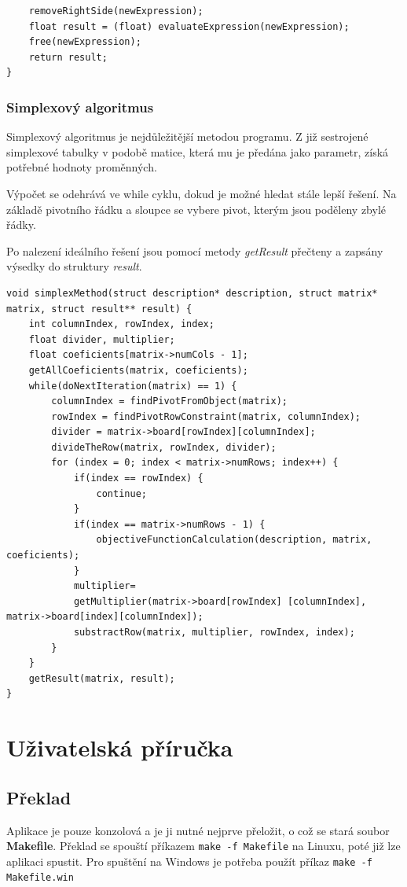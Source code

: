 \documentclass[
12pt,
a4paper,
pdftex,
czech,
titlepage
]{report}
\begin{document}
\begin{itemize}[label={}]
\begin{lstlisting}
    removeRightSide(newExpression);
    float result = (float) evaluateExpression(newExpression);
    free(newExpression);
    return result;
}
\end{lstlisting}

\subsection{Simplexový algoritmus}
Simplexový algoritmus je nejdůležitější metodou programu. Z již sestrojené simplexové tabulky v podobě matice, která mu je předána jako parametr, získá potřebné hodnoty proměnných.

Výpočet se odehrává ve while cyklu, dokud je možné hledat stále lepší řešení. Na základě pivotního řádku a sloupce se vybere pivot, kterým jsou poděleny zbylé řádky.

Po nalezení ideálního řešení jsou pomocí metody \textit{getResult} přečteny a zapsány výsedky do struktury \textit{result}.
\begin{lstlisting}
void simplexMethod(struct description* description, struct matrix* matrix, struct result** result) {
    int columnIndex, rowIndex, index;
    float divider, multiplier;
    float coeficients[matrix->numCols - 1];
    getAllCoeficients(matrix, coeficients);
    while(doNextIteration(matrix) == 1) {
        columnIndex = findPivotFromObject(matrix);
        rowIndex = findPivotRowConstraint(matrix, columnIndex);
        divider = matrix->board[rowIndex][columnIndex];
        divideTheRow(matrix, rowIndex, divider);
        for (index = 0; index < matrix->numRows; index++) {
            if(index == rowIndex) {
                continue;
            }
            if(index == matrix->numRows - 1) {
                objectiveFunctionCalculation(description, matrix, coeficients);
            }
            multiplier=
            getMultiplier(matrix->board[rowIndex] [columnIndex], matrix->board[index][columnIndex]);
            substractRow(matrix, multiplier, rowIndex, index);
        }
    }
    getResult(matrix, result);
}
\end{lstlisting}

\chapter{Uživatelská příručka}

\section{Překlad}
Aplikace je pouze konzolová a je ji nutné nejprve přeložit, o což se stará soubor \textbf{Makefile}. Překlad se spouští příkazem \texttt{make -f Makefile} na Linuxu, poté již lze aplikaci spustit. Pro spuštění na Windows je potřeba použít příkaz \texttt{make -f Makefile.win}


\end{itemize}
\end{document}
